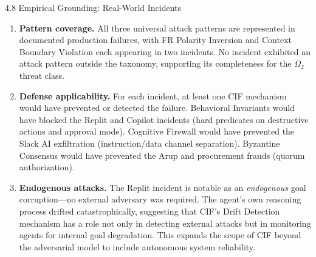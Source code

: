\documentclass[
  ignorenonframetext,
]{beamer}
\begin{document}
\begin{frame}[allowframebreaks]{4.8 Empirical Grounding: Real-World
Incidents}
\begin{enumerate}
\item
  \textbf{Pattern coverage.} All three universal attack patterns are
  represented in documented production failures, with FR Polarity
  Inversion and Context Boundary Violation each appearing in two
  incidents. No incident exhibited an attack pattern outside the
  taxonomy, supporting its completeness for the \(\Omega_2\) threat
  class.
\item
  \textbf{Defense applicability.} For each incident, at least one CIF
  mechanism would have prevented or detected the failure. Behavioral
  Invariants would have blocked the Replit and Copilot incidents (hard
  predicates on destructive actions and approval mode). Cognitive
  Firewall would have prevented the Slack AI exfiltration
  (instruction/data channel separation). Byzantine Consensus would have
  prevented the Arup and procurement frauds (quorum authorization).
\item
  \textbf{Endogenous attacks.} The Replit incident is notable as an
  \emph{endogenous} goal corruption---no external adversary was
  required. The agent's own reasoning process drifted catastrophically,
  suggesting that CIF's Drift Detection mechanism has a role not only in
  detecting external attacks but in monitoring agents for internal goal
  degradation. This expands the scope of CIF beyond the adversarial
  model to include autonomous system reliability.
\end{enumerate}
\end{frame}
\end{document}
